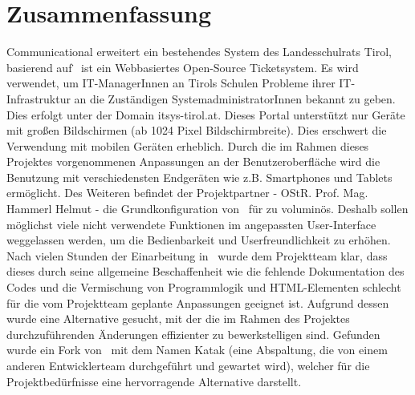 \chapter*{Zusammenfassung}
Communicational erweitert ein bestehendes System des Landesschulrats Tirol, basierend auf \getOst\. \getOst\ ist ein Webbasiertes Open-Source Ticketsystem. Es wird verwendet, um IT-ManagerInnen an Tirols Schulen Probleme ihrer IT-Infrastruktur an die Zuständigen SystemadministratorInnen bekannt zu geben. Dies erfolgt unter der Domain itsys-tirol.at. Dieses Portal unterstützt nur Geräte mit großen Bildschirmen (ab 1024 Pixel Bildschirmbreite). Dies erschwert die Verwendung mit mobilen Geräten erheblich. Durch die im Rahmen dieses Projektes vorgenommenen Anpassungen an der Benutzeroberfläche wird die Benutzung mit verschiedensten Endgeräten wie z.B. Smartphones und Tablets ermöglicht.\newline
Des Weiteren befindet der Projektpartner - OStR. Prof. Mag. Hammerl Helmut - die Grundkonfiguration von \getOst\ für zu voluminös. Deshalb sollen möglichst viele nicht verwendete Funktionen im angepassten User-Interface weggelassen werden, um die Bedienbarkeit und Userfreundlichkeit zu erhöhen.\newline
Nach vielen Stunden der Einarbeitung in \getOst\ wurde dem Projektteam klar, dass dieses durch seine allgemeine Beschaffenheit wie die fehlende Dokumentation des Codes und die Vermischung von Programmlogik und HTML-Elementen schlecht für die vom Projektteam geplante Anpassungen geeignet ist. Aufgrund dessen wurde eine Alternative gesucht, mit der die im Rahmen des Projektes durchzuführenden Änderungen effizienter zu bewerkstelligen sind. Gefunden wurde ein Fork von \getOst\ mit dem Namen Katak (eine Abspaltung, die von einem anderen Entwicklerteam durchgeführt und gewartet wird), welcher für die Projektbedürfnisse eine hervorragende Alternative darstellt.


